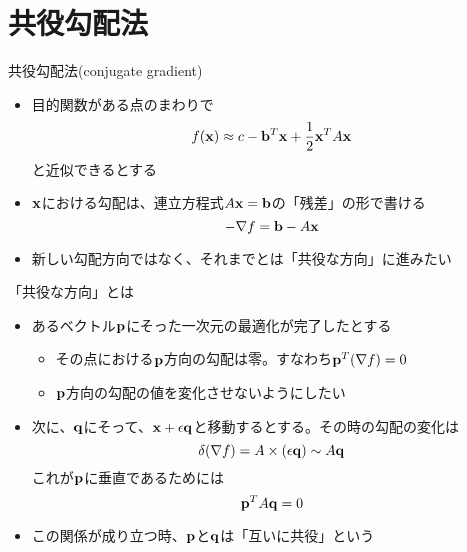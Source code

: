 \section{共役勾配法}

\begin{frame}[t,fragile]{共役勾配法(conjugate gradient)}
  \begin{itemize}
    \setlength{\itemsep}{1em}
  \item 目的関数がある点のまわりで
    \[
    f({\bf x}) \approx c - {\bf b}^T {\bf x} + \frac{1}{2} {\bf x}^T A {\bf x}
    \]
    と近似できるとする
  \item ${\bf x}$における勾配は、連立方程式$A{\bf x}={\bf b}$の「残差」の形で書ける
    \[
    -\nabla f = {\bf b} - A {\bf x}
    \]
  \item 新しい勾配方向ではなく、それまでとは「共役な方向」に進みたい
  \end{itemize}
\end{frame}

\begin{frame}[t,fragile]{「共役な方向」とは}
  \begin{itemize}
    \setlength{\itemsep}{1em}
  \item あるベクトル${\bf p}$にそった一次元の最適化が完了したとする
    \begin{itemize}
    \item その点における${\bf p}$方向の勾配は零。すなわち${\bf p}^T (\nabla f)=0$
    \item ${\bf p}$方向の勾配の値を変化させないようにしたい
  \end{itemize}
  \item 次に、${\bf q}$にそって、${\bf x}+\epsilon {\bf q}$と移動するとする。その時の勾配の変化は
    \[
      \delta(\nabla f) = A \times (\epsilon {\bf q}) \sim A {\bf q}
      \]
      これが${\bf p}$に垂直であるためには
    \[
      {\bf p}^T A {\bf q} = 0
      \]
    \item この関係が成り立つ時、${\bf p}$と${\bf q}$は「互いに共役」という
  \end{itemize}
\end{frame}

